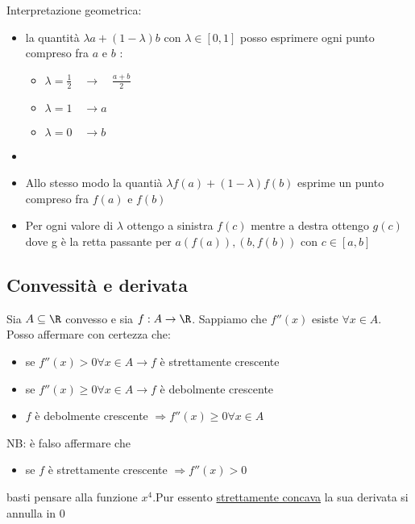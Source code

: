Interpretazione geometrica:
\begin{itemize}
	\item la quantità $\lambda a + \left( 1- \lambda  \right) b$ con $ \lambda  \in  \left[ 0,1 \right] $ posso esprimere ogni punto compreso fra  $a$ e $b$ :
	      \begin{itemize}
		      \item $\lambda  = \frac{1}{2} \quad \rightarrow \quad \frac{a+b}{2}$
		      \item $\lambda  = 1 \quad \rightarrow a$
		      \item $\lambda  = 0 \quad \rightarrow b$
	      \end{itemize}
	\item
	\item Allo stesso modo la quantià $\lambda f\left( a \right)  + \left( 1-\lambda  \right) f\left( b \right)$ esprime un punto compreso fra $f\left( a \right) $ e $f\left( b \right) $
	\item Per ogni valore di $\lambda $ ottengo a sinistra $f\left( c \right) $ mentre a destra ottengo $g\left( c \right) $ dove g è la retta passante per $a\left( f\left( a \right)  \right) , \left( b,f\left( b \right)  \right)  $ con $c \in  \left[ a,b \right] $
\end{itemize}
\subsection{Convessità e derivata}
Sia $ A \subseteq  \R$ convesso e sia $ f: A \to \R$. Sappiamo che $f''\left( x \right) $ esiste $ \forall x \in  A$. Posso affermare con certezza che:
\begin{itemize}
	\item se $f''\left( x \right)  > 0 \forall x \in  A \rightarrow f$ è strettamente crescente
	\item se $f''\left( x \right)  \ge 0 \forall x \in  A \rightarrow f$ è debolmente crescente
	\item $f$ è debolmente crescente $ \Rightarrow f''\left( x \right) \ge 0 \forall  x \in A$
\end{itemize}
NB: è falso affermare che
\begin{itemize}
	\item se $f$ è strettamente crescente $ \Rightarrow f''\left( x \right) > 0 $
\end{itemize}
basti pensare alla funzione $x^4$.Pur essento \underline{strettamente concava} la sua derivata si annulla in 0
